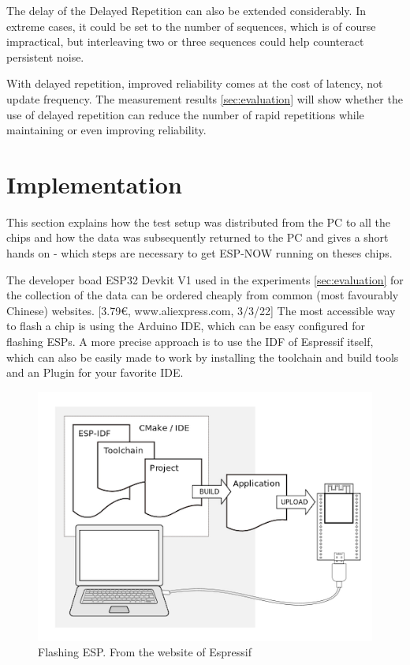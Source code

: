 The delay of the Delayed Repetition can also be extended considerably.
In extreme cases, it could be set to the number of sequences, which is of course impractical,
but interleaving two or three sequences could help counteract persistent noise.

With delayed repetition, improved reliability comes at the cost of latency, not update frequency.
The measurement results \cref{sec:evaluation} will show whether the use of delayed repetition can reduce the number of rapid repetitions 
while maintaining or even improving reliability.

\section{Implementation}

This section explains how the test setup was distributed from the PC to all the chips 
and how the data was subsequently returned to the PC
and gives a short hands on - which steps are necessary to get ESP-NOW running on theses chips.

The developer boad ESP32 Devkit V1 used in the experiments \cref{sec:evaluation} for the collection of the data
can be ordered cheaply from common (most favourably Chinese) websites. [3.79€, www.aliexpress.com, 3/3/22]
The most accessible way to flash a chip is using the Arduino IDE, which can be easy configured for flashing ESPs.
A more precise approach is to use the IDF of Espressif itself, 
which can also be easily made to work by installing the toolchain and build tools and an Plugin for your favorite IDE.

\begin{figure}[h]
	\centering
	\includegraphics[scale=0.4]{figures/ESP-ISF.png}
	\caption{Flashing ESP. From the website of Espressif}
	\label{fig:ESP-IDF}
\end{figure}

